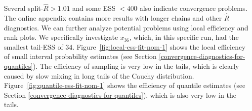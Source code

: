 \documentclass[american,]{article}
\begin{document}


Several split-\(\widehat{R}>1.01\) and some ESS \(<400\)
also indicate convergence problems. The online appendix contains more results 
with longer chains and other \(\widehat{R}\) diagnostics.
%
We can further analyze potential problems using local efficiency and
rank plots. We specifically investigate \(x_{36}\), which, in this
specific run, had the smallest tail-ESS of 34. 
Figure~\ref{fig:local-ess-fit-nom-1} shows the local efficiency of small 
interval probability estimates (see Section \ref{convergence-diagnostics-for-quantiles}).
The efficiency of sampling is very low in the tails, which is clearly
caused by slow mixing in long tails of the Cauchy distribution.  
%
Figure~\ref{fig:quantile-ess-fit-nom-1} shows the efficiency
of quantile estimates (see Section \ref{convergence-diagnostics-for-quantiles}), 
which is also very low in the tails. 
\end{document}
